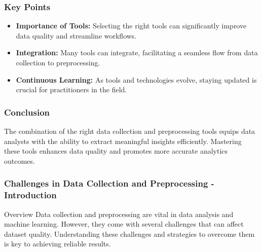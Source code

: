 \documentclass[aspectratio=169]{beamer}
\begin{document}
\begin{frame}
    \frametitle{Key Points}
    \begin{itemize}
        \item \textbf{Importance of Tools:} Selecting the right tools can significantly improve data quality and streamline workflows.
        \item \textbf{Integration:} Many tools can integrate, facilitating a seamless flow from data collection to preprocessing.
        \item \textbf{Continuous Learning:} As tools and technologies evolve, staying updated is crucial for practitioners in the field.
    \end{itemize}
\end{frame}

\begin{frame}
    \frametitle{Conclusion}
    The combination of the right data collection and preprocessing tools equips data analysts with the ability to extract meaningful insights efficiently. Mastering these tools enhances data quality and promotes more accurate analytics outcomes.
\end{frame}

\begin{frame}[fragile]
    \frametitle{Challenges in Data Collection and Preprocessing - Introduction}
    \begin{block}{Overview}
        Data collection and preprocessing are vital in data analysis and machine learning. However, they come with several challenges that can affect dataset quality. 
        Understanding these challenges and strategies to overcome them is key to achieving reliable results.
    \end{block}
\end{frame}
\end{document}

